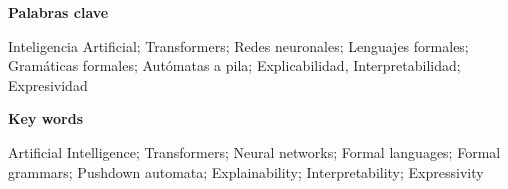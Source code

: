 {\huge\bfseries \space Palabras clave}
\bigskip

Inteligencia Artificial; Transformers; Redes neuronales; Lenguajes formales; Gramáticas formales; Autómatas a pila; Explicabilidad, Interpretabilidad; Expresividad

\bigskip
\bigskip\bigskip
\bigskip
{\huge\bfseries \space Key words}
\bigskip

Artificial Intelligence; Transformers; Neural networks; Formal languages; Formal grammars; Pushdown automata; Explainability; Interpretability; Expressivity
